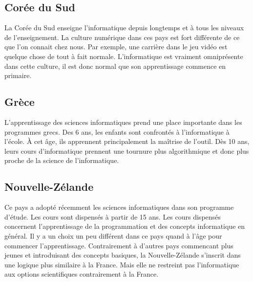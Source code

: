 \subsection{Corée du Sud}
La Corée du Sud enseigne l'informatique depuis longtemps et à tous les niveaux de l'enseignement. La culture numérique dans ces pays est fort différente de ce que l'on connait chez nous. Par exemple, une carrière dans le jeu vidéo est quelque chose de tout à fait normale. L'informatique est vraiment omniprésente dans cette culture, il est donc normal que son apprentissage commence en primaire.

\subsection{Grèce}
L'apprentissage des sciences informatiques prend une place importante dans les programmes grecs. Des 6 ans, les enfants sont confrontés à l'informatique à l'école. À cet âge, ils apprennent principalement la maîtrise de l'outil. Dès 10 ans, leurs cours d'informatique prennent une tournure plus algorithmique et donc plus proche de la science de l'informatique.

\subsection{Nouvelle-Zélande}
Ce pays a adopté récemment les sciences informatiques dans son programme d'étude. Les cours sont dispensés à partir de 15 ans. Les cours dispensés concernent l'apprentissage de la programmation et des concepts informatique en général. Il y a un choix un peu différent dans ce pays quand à l'âge pour commencer l'apprentissage. Contrairement à d'autres pays commencant plus jeunes et introduisant des concepts basiques, la Nouvelle-Zélande s'inscrit dans une logique plus similaire à la France. Mais elle ne restreint pas l'informatique aux options scientifiques contrairement à la France.

